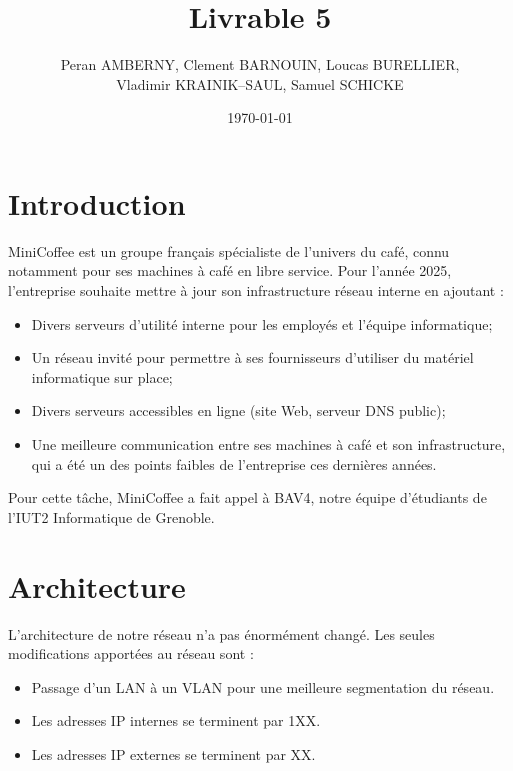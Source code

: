 \documentclass{article}
\title{Livrable 5}
\author{
Peran AMBERNY, Clement BARNOUIN, Loucas BURELLIER, \\
Vladimir KRAINIK--SAUL, Samuel SCHICKE 
}
\date{\today}
\begin{document}
\maketitle

\tableofcontents
\clearpage


\section{Introduction}
MiniCoffee est un groupe français spécialiste de l’univers du café, connu notamment pour ses machines à café en libre service. Pour l’année 2025, l’entreprise souhaite mettre à jour son infrastructure réseau interne en ajoutant : 
\begin{itemize}
    \item Divers serveurs d’utilité interne pour les employés et l'équipe informatique;
    \item Un réseau invité pour permettre à ses fournisseurs d’utiliser du matériel informatique sur place;
    \item Divers serveurs accessibles en ligne (site Web, serveur DNS public);
    \item Une meilleure communication entre ses machines à café et son infrastructure, qui a été un des points faibles de l’entreprise ces dernières années.
\end{itemize}
Pour cette tâche, MiniCoffee a fait appel à BAV4, notre équipe d’étudiants de l’IUT2 Informatique de Grenoble.

\section{Architecture}
L'architecture de notre réseau n'a pas énormément changé. 
Les seules modifications apportées au réseau sont : 
\begin{itemize}
    \item Passage d'un LAN à un VLAN pour une meilleure segmentation du réseau.
    \item Les adresses IP internes se terminent par 1XX.
    \item Les adresses IP externes se terminent par XX.
\end{itemize}
\end{document}
